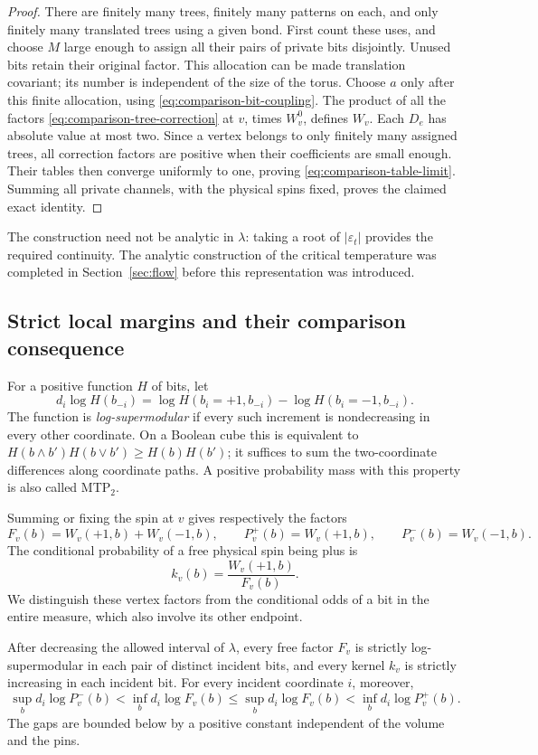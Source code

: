 \begin{proof}
There are finitely many trees, finitely many patterns on each, and only
finitely many translated trees using a given bond.  First count these
uses, and choose \(M\) large enough to assign all their pairs of private
bits disjointly.  Unused bits retain their original factor.  This
allocation can be made translation covariant; its number is independent
of the size of the torus.  Choose \(a\) only after this finite allocation,
using \eqref{eq:comparison-bit-coupling}.
The product of all the factors
\eqref{eq:comparison-tree-correction} at \(v\), times \(W_v^0\), defines
\(W_v\).  Each \(D_e\) has absolute value at most two.  Since a vertex
belongs to only finitely many assigned trees, all correction factors are
positive when their coefficients are small enough.  Their tables then
converge uniformly to one, proving
\eqref{eq:comparison-table-limit}.  Summing all private channels, with
the physical spins fixed, proves the claimed exact identity.
\end{proof}

The construction need not be analytic in \(\lambda\): taking a root of
\(\lvert\varepsilon_t\rvert\) provides the required continuity.  The
analytic construction of the critical temperature was completed in
Section~\ref{sec:flow} before this representation was introduced.

\subsection{Strict local margins and their comparison consequence}

For a positive function \(H\) of bits, let
\[
 d_i\log H(b_{-i})
 =\log H(b_i=+1,b_{-i})-\log H(b_i=-1,b_{-i}).
\]
The function is \emph{log-supermodular} if every such increment is
nondecreasing in every other coordinate.  On a Boolean cube this is
equivalent to
\(H(b\wedge b')H(b\vee b')\ge H(b)H(b')\); it suffices to sum the
two-coordinate differences along coordinate paths.  A positive
probability mass with this property is also called MTP\(_2\).

Summing or fixing the spin at \(v\) gives respectively the factors
\[
 F_v(b)=W_v(+1,b)+W_v(-1,b),\qquad
 P_v^+(b)=W_v(+1,b),\qquad P_v^-(b)=W_v(-1,b).
\]
The conditional probability of a free physical spin being plus is
\[
 k_v(b)=\frac{W_v(+1,b)}{F_v(b)}.
\]
We distinguish these vertex factors from the conditional odds of a bit
in the entire measure, which also involve its other endpoint.

\begin{lemma}
\label{lem:comparison-margins}
After decreasing the allowed interval of \(\lambda\), every free factor
\(F_v\) is strictly log-supermodular in each pair of distinct incident
bits, and every kernel \(k_v\) is strictly increasing in each incident
bit.  For every incident coordinate \(i\), moreover,
\begin{equation}
 \sup_b d_i\log P_v^-(b)
 <\inf_b d_i\log F_v(b)
 \le\sup_b d_i\log F_v(b)
 <\inf_b d_i\log P_v^+(b).
 \label{eq:comparison-strict-margins}
\end{equation}
The gaps are bounded below by a positive constant independent of the
volume and the pins.
\end{lemma}

